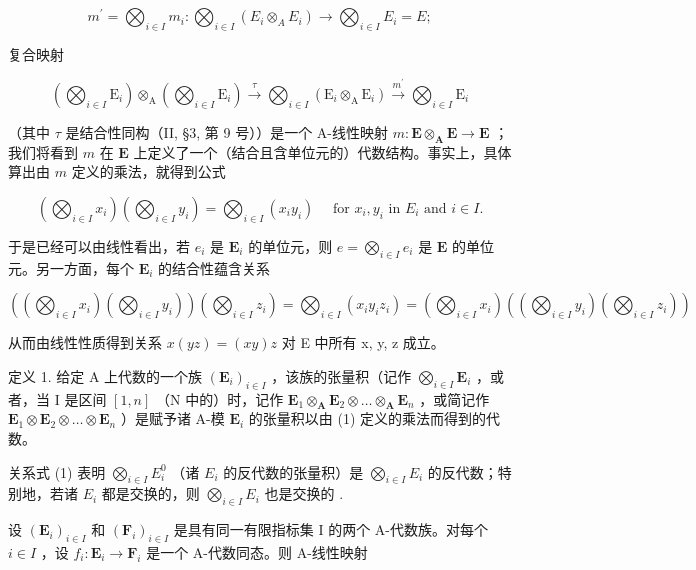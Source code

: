 \[
m ^ {\prime} = \bigotimes_ {i \in I} m _ {i}: \bigotimes_ {i \in I} (E _ {i} \otimes_ {A} E _ {i}) \rightarrow \bigotimes_ {i \in I} E _ {i} = E;
\]

复合映射

\[
\left(\bigotimes_ {i \in I} \mathrm{E} _ {i}\right) \otimes_ {\mathrm{A}} \left(\bigotimes_ {i \in I} \mathrm{E} _ {i}\right) \xrightarrow {\tau} \bigotimes_ {i \in I} \left(\mathrm{E} _ {i} \otimes_ {\mathrm{A}} \mathrm{E} _ {i}\right) \xrightarrow {m ^ {\prime}} \bigotimes_ {i \in I} \mathrm{E} _ {i}
\]

（其中 \(\tau\) 是结合性同构（II, §3, 第 9 号））是一个 A-线性映射 \(m\colon \mathbf{E} \otimes_{\mathbf{A}} \mathbf{E} \to \mathbf{E}\) ；我们将看到 \(m\) 在 \(\mathbf{E}\) 上定义了一个（结合且含单位元的）代数结构。事实上，具体算出由 \(m\) 定义的乘法，就得到公式

\[
\left(\bigotimes_ {i \in I} x _ {i}\right) \left(\bigotimes_ {i \in I} y _ {i}\right) = \bigotimes_ {i \in I} \left(x _ {i} y _ {i}\right) \quad \text { for } x _ {i}, y _ {i} \text { in } E _ {i} \text { and } i \in I.\tag{1}
\]

于是已经可以由线性看出，若 \(e_i\) 是 \(\mathbf{E}_i\) 的单位元，则 \(e = \bigotimes_{i \in I} e_i\) 是 \(\mathbf{E}\) 的单位元。另一方面，每个 \(\mathbf{E}_i\) 的结合性蕴含关系

\[
\left(\left(\bigotimes_ {i \in I} x _ {i}\right) \left(\bigotimes_ {i \in I} y _ {i}\right)\right) \left(\bigotimes_ {i \in I} z _ {i}\right) = \bigotimes_ {i \in I} \left(x _ {i} y _ {i} z _ {i}\right) = \left(\bigotimes_ {i \in I} x _ {i}\right) \left(\left(\bigotimes_ {i \in I} y _ {i}\right) \left(\bigotimes_ {i \in I} z _ {i}\right)\right)
\]

从而由线性性质得到关系 \(x(yz) = (xy)z\) 对 E 中所有 x, y, z 成立。

定义 1. 给定 A 上代数的一个族 \((\mathbf{E}_i)_{i\in I}\) ，该族的张量积（记作 \(\bigotimes_{i\in I}\mathbf{E}_i\) ，或者，当 I 是区间 \([1,n]\) （N 中的）时，记作 \(\mathbf{E}_1\otimes_\mathbf{A}\mathbf{E}_2\otimes \dots \otimes_\mathbf{A}\mathbf{E}_n\) ，或简记作 \(\mathbf{E}_1\otimes \mathbf{E}_2\otimes \dots \otimes \mathbf{E}_n\) ）是赋予诸 A-模 \(\mathbf{E}_i\) 的张量积以由 (1) 定义的乘法而得到的代数。

关系式 (1) 表明 \(\bigotimes_{i\in I}E_i^0\) （诸 \(E_{i}\) 的反代数的张量积）是 \(\bigotimes_{i\in I}E_{i}\) 的反代数；特别地，若诸 \(E_{i}\) 都是交换的，则 \(\bigotimes_{i\in I}E_{i}\) 也是交换的 .

设 \((\mathbf{E}_i)_{i\in I}\) 和 \((\mathbf{F}_i)_{i\in I}\) 是具有同一有限指标集 I 的两个 A-代数族。对每个 \(i\in I\) ，设 \(f_{i}\colon \mathbf{E}_{i}\to \mathbf{F}_{i}\) 是一个 A-代数同态。则 A-线性映射

